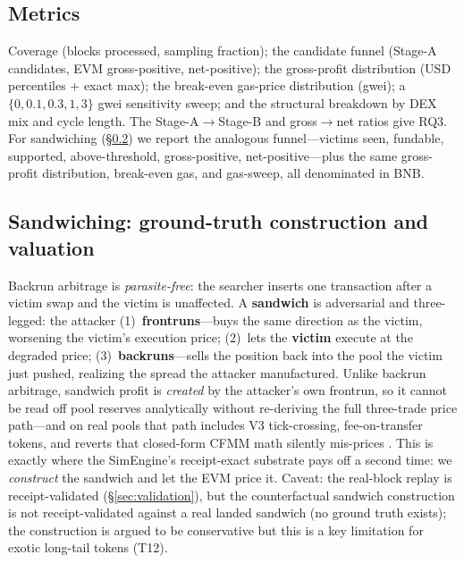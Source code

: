 \documentclass[11pt]{article}
\begin{document}
\subsection{Metrics}
Coverage (blocks processed, sampling fraction); the candidate funnel (Stage-A
candidates, EVM gross-positive, net-positive); the gross-profit distribution (USD
percentiles + exact max); the break-even gas-price distribution (gwei); a
$\{0,0.1,0.3,1,3\}$ gwei sensitivity sweep; and the structural breakdown by DEX mix
and cycle length. The Stage-A$\to$Stage-B and gross$\to$net ratios give RQ3. For
sandwiching (\S\ref{sec:sandwich-method}) we report the analogous funnel---victims
seen, fundable, supported, above-threshold, gross-positive, net-positive---plus the
same gross-profit distribution, break-even gas, and gas-sweep, all denominated in
BNB.

\subsection{Sandwiching: ground-truth construction and valuation}
\label{sec:sandwich-method}
Backrun arbitrage is \emph{parasite-free}: the searcher inserts one transaction
after a victim swap and the victim is unaffected. A \textbf{sandwich} is adversarial
and three-legged: the attacker (1)~\textbf{frontruns}---buys the same direction as
the victim, worsening the victim's execution price; (2)~lets the \textbf{victim}
execute at the degraded price; (3)~\textbf{backruns}---sells the position back into
the pool the victim just pushed, realizing the spread the attacker manufactured.
Unlike backrun arbitrage, sandwich profit is \emph{created} by the attacker's own
frontrun, so it cannot be read off pool reserves analytically without re-deriving
the full three-trade price path---and on real pools that path includes V3
tick-crossing, fee-on-transfer tokens, and reverts that closed-form CFMM math
silently mis-prices \cite{zhou2021hft,gogol2026sandwich}. This is exactly where the
SimEngine's receipt-exact substrate pays off a second time: we \emph{construct} the
sandwich and let the EVM price it. Caveat: the real-block replay is receipt-validated
(\S\ref{sec:validation}), but the counterfactual sandwich construction is not
receipt-validated against a real landed sandwich (no ground truth exists); the
construction is argued to be conservative but this is a key limitation for exotic long-tail
tokens (T12).
\end{document}
